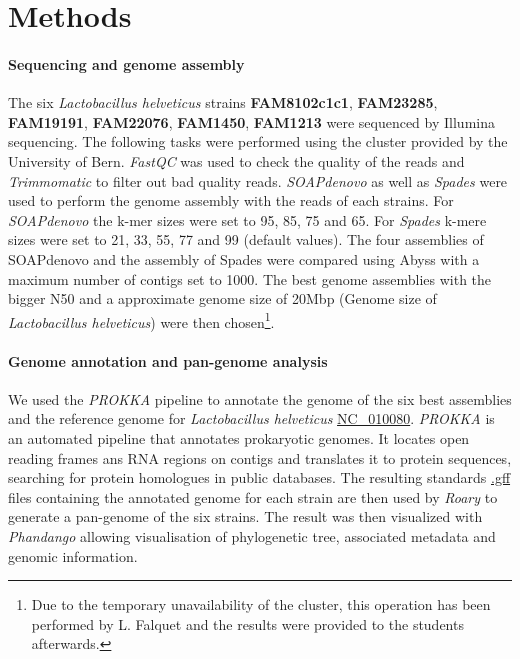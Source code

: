\documentclass[10pt,a4paper]{article}
\begin{document}
  


\section*{Methods}

\paragraph{Sequencing and genome assembly}
The six \textit{Lactobacillus helveticus} strains \textbf{FAM8102c1c1}, \textbf{FAM23285}, \textbf{FAM19191}, \textbf{FAM22076}, \textbf{FAM1450}, \textbf{FAM1213}  were sequenced by Illumina sequencing. The following tasks were performed using the cluster provided by the University of Bern.  \textit{FastQC}\cite{andrews2012} was used to check the quality of the reads and \textit{Trimmomatic}\cite{bolger_trimmomatic:_2014} to filter out bad quality reads. \textit{SOAPdenovo} as well as \textit{Spades} were used to perform the genome assembly with the reads of each strains. For \textit{SOAPdenovo} the k-mer sizes were set to 95, 85, 75 and 65. For \textit{Spades} k-mere sizes were set to 21, 33, 55, 77 and 99 (default values). The four assemblies of SOAPdenovo and the assembly of Spades were compared using Abyss with a maximum number of contigs set to 1000. The best genome assemblies with the bigger N50 and a approximate genome size of 20Mbp (Genome size of \textit{Lactobacillus helveticus}) were then chosen\footnote{Due to the temporary unavailability of the cluster, this operation has been performed by L. Falquet and the results were provided to the students afterwards.}.


\paragraph{Genome annotation and pan-genome analysis}
We used the \textit{PROKKA} pipeline\cite{seemann_prokka:_2014} to annotate the genome of the six best assemblies and the reference genome for \textit{Lactobacillus helveticus} \href{https://www.ncbi.nlm.nih.gov/genome/?term=NC_010080}{NC\_010080}. \textit{PROKKA} is an automated pipeline that annotates prokaryotic genomes. It locates open reading frames ans RNA regions on contigs and translates it to protein sequences, searching for protein homologues in public databases. The resulting standards \href{https://www.ensembl.org/info/website/upload/gff.html}{.gff} files containing the annotated genome for each strain are then used by \textit{Roary}\cite{page_roary:_2015} to generate a pan-genome of the six strains. The result was then visualized with \textit{Phandango}\cite{hadfield_phandango:_2018} allowing visualisation of phylogenetic tree, associated metadata and genomic information.
\end{document}
